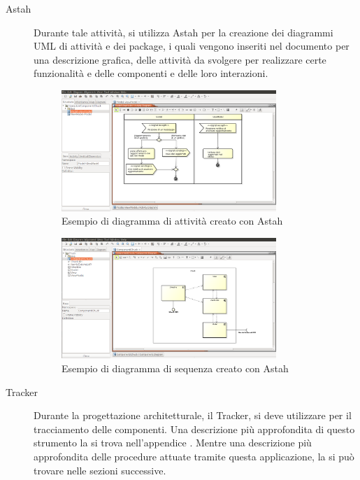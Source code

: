 				\begin{description}
					\item[Astah] Durante tale attività, si utilizza Astah per la creazione dei diagrammi UML di attività e dei package, i quali vengono inseriti nel documento  per una descrizione grafica, delle attività da svolgere per realizzare certe funzionalità e delle componenti e delle loro interazioni. 
					\begin{figure}[H]
						\centering
						\includegraphics[width=0.8\textwidth]{NormeDiProgetto/Pics/AstahAttivita.png}
						\caption{Esempio di diagramma di attività creato con Astah}
					\end{figure}

					\begin{figure}[H]
					\centering
					\includegraphics[width=0.8\textwidth]{NormeDiProgetto/Pics/ComponentiAstah.png}
					\caption{Esempio di diagramma di sequenza creato con Astah}
				\end{figure}
					\item[Tracker] Durante la progettazione architetturale, il Tracker, si deve utilizzare per il tracciamento delle componenti. Una descrizione più approfondita di questo strumento la si trova nell'appendice . Mentre una descrizione più approfondita delle procedure attuate tramite questa applicazione, la si può trovare nelle sezioni successive.
				\end{description}
